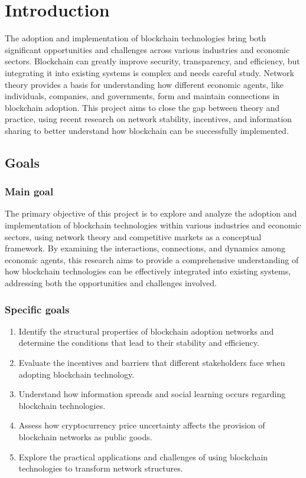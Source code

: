 
\chapter{Introduction}\label{chapter:Intro} %

The adoption and implementation of blockchain technologies bring both significant opportunities and challenges across various industries and economic sectors. Blockchain can greatly improve security, transparency, and efficiency, but integrating it into existing systems is complex and needs careful study. Network theory provides a basis for understanding how different economic agents, like individuals, companies, and governments, form and maintain connections in blockchain adoption. This project aims to close the gap between theory and practice, using recent research on network stability, incentives, and information sharing to better understand how blockchain can be successfully implemented. 


\section{Goals}
\subsection{Main goal}

The primary objective of this project is to explore and analyze the adoption and implementation of blockchain technologies within various industries and economic sectors, using network theory and competitive markets as a conceptual framework. By examining the interactions, connections, and dynamics among economic agents, this research aims to provide a comprehensive understanding of how blockchain technologies can be effectively integrated into existing systems, addressing both the opportunities and challenges involved.

\subsection{Specific goals}

\begin{enumerate}
\item Identify the structural properties of blockchain adoption networks and determine the conditions that lead to their stability and efficiency.

\item Evaluate the incentives and barriers that different stakeholders face when adopting blockchain technology.

\item Understand how information spreads and social learning occurs regarding blockchain technologies.

\item Assess how cryptocurrency price uncertainty affects the provision of blockchain networks as public goods.

\item Explore the practical applications and challenges of using blockchain technologies to transform network structures.
\end{enumerate}


